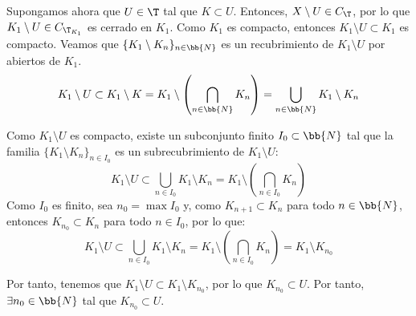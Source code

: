 \begin{ejercicio}
    Supongamos ahora que $U\in \T$ tal que $K\subset U$. Entonces, $X \setminus U\in C_\T$, por lo que $K_1\setminus U\in C_{\T_{K_1}}$ es cerrado en $K_1$.
    Como $K_1$ es compacto, entonces $K_1\setminus U\subset K_1$ es compacto. Veamos que $\{K_1\setminus K_n\}_{n\in \bb{N}}$ es un recubrimiento de $K_1\setminus U$ por abiertos de $K_1$.
    \begin{equation*}
        K_1\setminus U \subset K_1\setminus K
        = K_1 \setminus \left(\bigcap_{n\in \bb{N}} K_n\right)
        = \bigcup_{n\in \bb{N}} K_1\setminus K_n
    \end{equation*}

    Como $K_1\setminus U$ es compacto, existe un subconjunto finito $I_0\subset \bb{N}$ tal que la familia $\{K_1\setminus K_n\}_{n\in I_0}$ es un subrecubrimiento de $K_1\setminus U$:
    \begin{equation*}
        K_1\setminus U \subset \bigcup_{n\in I_0} K_1\setminus K_n
        = K_1\setminus \left(\bigcap_{n\in I_0} K_n\right)
    \end{equation*}
    Como $I_0$ es finito, sea $n_0=\max I_0$ y, como $K_{n+1}\subset K_n$ para todo $n\in \bb{N}$, entonces
    $K_{n_0} \subset K_n$ para todo $n\in I_0$, por lo que:
    \begin{equation*}
        K_1\setminus U \subset \bigcup_{n\in I_0} K_1\setminus K_n
        = K_1\setminus \left(\bigcap_{n\in I_0} K_n\right)
        = K_1\setminus K_{n_0}
    \end{equation*}

    Por tanto, tenemos que $K_1\setminus U \subset K_1\setminus K_{n_0}$, por lo que $K_{n_0}\subset U$. Por tanto, $\exists n_0\in \bb{N}$ tal que $K_{n_0}\subset U$.


\end{ejercicio}


